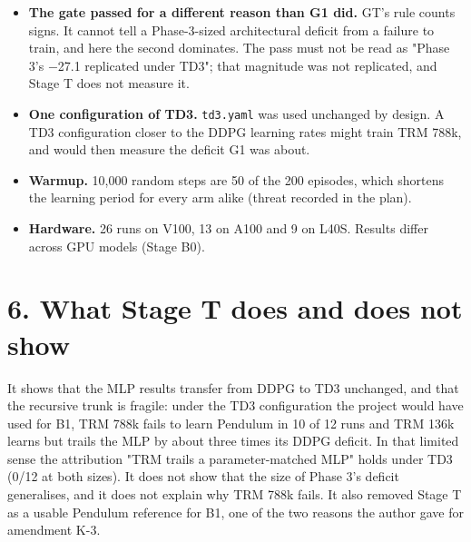 \documentclass[11pt]{article}
\begin{document}
\begin{itemize}
\item \textbf{The gate passed for a different reason than G1 did.} GT's rule counts signs. It cannot tell a Phase-3-sized architectural deficit from a failure to train, and here the second dominates. The pass must not be read as "Phase 3's $-$27.1 replicated under TD3"; that magnitude was not replicated, and Stage T does not measure it.
\item \textbf{One configuration of TD3.} \texttt{td3.yaml} was used unchanged by design. A TD3 configuration closer to the DDPG learning rates might train TRM 788k, and would then measure the deficit G1 was about.
\item \textbf{Warmup.} 10,000 random steps are 50 of the 200 episodes, which shortens the learning period for every arm alike (threat recorded in the plan).
\item \textbf{Hardware.} 26 runs on V100, 13 on A100 and 9 on L40S. Results differ across GPU models (Stage B0).
\end{itemize}



\section*{6. What Stage T does and does not show}



It shows that the MLP results transfer from DDPG to TD3 unchanged, and that the recursive trunk is fragile: under the TD3 configuration the project would have used for B1, TRM 788k fails to learn Pendulum in 10 of 12 runs and TRM 136k learns but trails the MLP by about three times its DDPG deficit. In that limited sense the attribution "TRM trails a parameter-matched MLP" holds under TD3 (0/12 at both sizes). It does not show that the size of Phase 3's deficit generalises, and it does not explain why TRM 788k fails. It also removed Stage T as a usable Pendulum reference for B1, one of the two reasons the author gave for amendment K-3.
\end{document}
